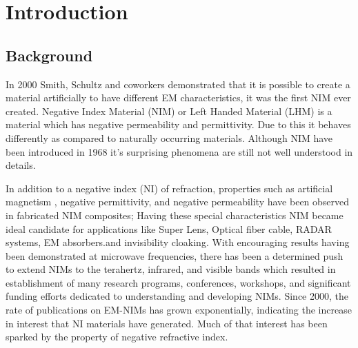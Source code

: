 
\chapter{Introduction} %

\label{Chapter1} %

\fancyhead[RO]{\thepage}
\fancyhead[RE]{\thepage}


\section{Background }
In 2000 Smith, Schultz and coworkers \cite{smith} demonstrated that it is possible to create a material artificially to have different EM  characteristics, it was the first NIM ever created. Negative Index Material (NIM) or Left Handed Material (LHM) is a material which has negative permeability and permittivity. Due to this it behaves differently as compared to naturally occurring materials. Although NIM have been introduced in 1968 \cite{vesel}
it's surprising phenomena are still not well understood in details.

 In addition
to a negative index (NI) of refraction, properties such as artificial
magnetism \cite{pendry}
, negative permittivity, and negative permeability have
been observed in fabricated NIM composites; 
Having these special characteristics NIM became ideal candidate 
for applications like Super Lens, Optical fiber cable, RADAR systems, EM absorbers.and invisibility cloaking. With
encouraging results having been demonstrated at microwave
frequencies, there has been a determined push to extend NIMs to
the terahertz, infrared, and visible bands which resulted in establishment of many
research programs, conferences, workshops, and significant
funding efforts dedicated to understanding and developing NIMs.
Since 2000, the rate of publications on EM-NIMs has grown
exponentially, \cite{rama}
indicating the increase in interest that NI
materials have generated. Much of that interest has been sparked by
the property of negative refractive index.


